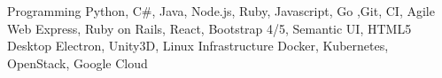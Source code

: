 \begin{cvskills}
  \cvskill
    {Programming}
    {Python, C\#, Java, Node.js, Ruby, Javascript, Go ,Git, CI, Agile}
  \cvskill
    {Web}
    {Express, Ruby on Rails, React, Bootstrap 4/5, Semantic UI, HTML5}
  \cvskill
    {Desktop}
    {Electron, Unity3D, Linux}
  \cvskill
    {Infrastructure}
    {Docker, Kubernetes, OpenStack, Google Cloud}
\end{cvskills}
